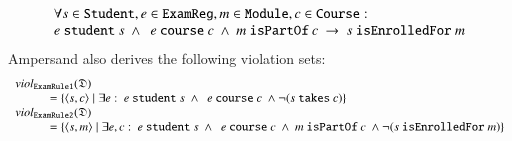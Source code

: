 \documentclass{elsarticle}
\begin{document}
\[\begin{array}{l}\forall s\in\text{\tt Student}, e\in\text{\tt ExamReg}, m\in\text{\tt Module}, c\in\text{\tt Course}:\\
   e\ \text{\tt student}\ s\ \wedge\ \ e\ \text{\tt course}\ c\ \wedge\ m\ \text{\tt isPartOf}\ c\ \rightarrow\ s\ \text{\tt isEnrolledFor}\ m
\end{array}\]
   Ampersand also derives the following violation sets:
\[\begin{array}{l}
   \viol{\text{\tt ExamRule1}}{\dataset}\\
   \hspace{1cm}=\{\pair{s}{c}\mid\exists e:\ e\ \text{\tt student}\ s\ \wedge\ \ e\ \text{\tt course}\ c\ \wedge\neg(s\ \text{\tt takes}\ c)\}\\
   \viol{\text{\tt ExamRule2}}{\dataset}\\
   \hspace{1cm}=\{\pair{s}{m}\mid\exists e,c:\ e\ \text{\tt student}\ s\ \wedge\ \ e\ \text{\tt course}\ c\ \wedge\ m\ \text{\tt isPartOf}\ c\ \wedge\neg(s\ \text{\tt isEnrolledFor}\ m)\}
\end{array}\]
\end{document}
